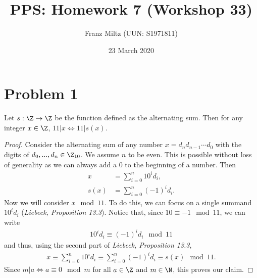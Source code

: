 \documentclass{article}
\title{PPS: Homework 7 (Workshop 33)}
\author{Franz Miltz (UUN: S1971811)}
\date{23 March 2020}
\begin{document}
\maketitle
\section*{Problem 1}
\begin{claim}
	Let $s:\Z \to \Z$ be the function defined as the alternating sum. Then for any integer $x\in\Z$, $11|x \Leftrightarrow 11|s(x)$.
\end{claim}
\begin{proof}
	Consider the alternating sum of any number $x=d_nd_{n-1}\cdots d_0$ with the digits of $d_0,...,d_n\in\Z_{10}$.
	We assume $n$ to be even. This is possible without loss of generality as we can always add a $0$ to the beginning of a number.
	Then
	\begin{align*}
		x    & = \sum_{i=0}^n 10^id_i,   \\
		s(x) & = \sum_{i=0}^n (-1)^id_i.
	\end{align*}
	Now we will consider $x\mod 11$. To do this, we can focus on a single summand $10^id_i$ (\emph{Liebeck, Proposition 13.3}).
	Notice that, since $10\equiv -1 \mod 11$, we can write
	\begin{align*}
		10^id_i \equiv (-1)^id_i \mod 11
	\end{align*}
	and thus, using the second part of \emph{Liebeck, Proposition 13.3},
	\begin{align*}
		x \equiv \sum_{i=0}^n 10^id_i \equiv \sum_{i=0}^n (-1)^id_i\equiv s(x)\mod 11.
	\end{align*}
	Since $m|a\Leftrightarrow a\equiv 0 \mod m$ for all $a\in\Z$ and $m\in\N$, this proves our claim.
\end{proof}
\end{document}
